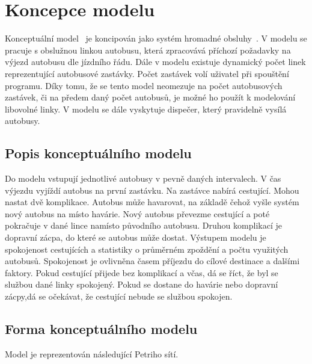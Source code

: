 \documentclass[a4paper]{article}
\begin{document}
    \section{Koncepce modelu}
    \label{sec:concept}

        Konceptuální model~\cite[snímek 48]{IMS_slides} je koncipován jako systém hromadné obsluhy~\cite[snímek 136]{IMS_slides}.
        V modelu se pracuje s obslužnou linkou autobusu, která zpracovává příchozí požadavky na výjezd autobusu dle jízdního řádu. Dále v modelu existuje dynamický počet linek reprezentující autobusové zastávky. Počet zastávek volí uživatel při spouštění programu. Díky tomu, že se tento model neomezuje na počet autobusových zastávek, či na předem daný počet autobusů, je možné ho použít k modelování libovolné linky. V modelu se dále vyskytuje dispečer, který pravidelně vysílá autobusy.

        \subsection{Popis konceptuálního modelu}
        \label{subsec:conceptual_model_description}
            Do modelu vstupují jednotlivé autobusy v pevně daných intervalech. 
            V čas výjezdu vyjíždí autobus na první zastávku. Na zastávce nabírá cestující. Mohou nastat dvě komplikace. Autobus může havarovat, na základě čehož vyšle systém nový autobus na místo havárie. Nový autobus převezme cestující a poté pokračuje v dané lince namísto původního autobusu. Druhou komplikací je dopravní zácpa, do které se autobus může dostat. Výstupem modelu je spokojenost cestujících a statistiky o průměrném zpoždění a počtu využitých autobusů. Spokojenost je ovlivněna časem příjezdu do cílové destinace a dalšími faktory. Pokud cestující přijede bez komplikací a včas, dá se říct, že byl se službou dané linky spokojený. Pokud se dostane do havárie nebo dopravní zácpy,dá se očekávat, že cestující nebude se službou spokojen.
            
        \subsection{Forma konceptuálního modelu}
        \label{subsec:conceptual_model}

            Model je reprezentován následující Petriho sítí.
\end{document}
